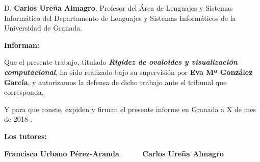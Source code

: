 \vspace{0.5cm}

D. \textbf{Carlos Ureña Almagro}, Profesor del Área de Lenguajes y Sistemas Informático del Departamento de Lenguajes y Sistemas Informáticos de la Universidad de Granada.


\vspace{0.5cm}

\textbf{Informan:}

\vspace{0.5cm}

Que el presente trabajo, titulado \textit{\textbf{Rigidez de ovaloides y visualización computacional}},
ha sido realizado bajo su supervisión por \textbf{Eva Mª González García}, y autorizamos la defensa de dicho trabajo ante el tribunal que corresponda.

\vspace{0.5cm}

Y para que conste, expiden y firman el presente informe en Granada a X de mes de 2018 .

\vspace{1cm}

\textbf{Los tutores:}

\vspace{5cm}

\noindent \textbf{Francisco Urbano Pérez-Aranda \ \ \ \ \ Carlos Ureña Almagro}





